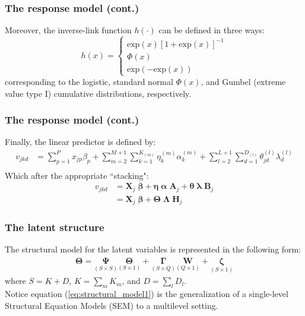 \documentclass[arial,12pt,xcolor=dvipsnames]{beamer}
\begin{document}
%
\begin{frame}
	\frametitle{The response model (cont.)}
	Moreover, the inverse-link function $h(\cdot)$ can be defined in three ways:
	\begin{equation} \label{eq:response_dich1}
		h(x) = 
		\begin{cases}
			\text{exp}(x)[1 + \text{exp}(x)]^{-1} \\
			\Phi(x)  \\
			\text{exp}(-\text{exp}(x))
		\end{cases}
	\end{equation}
	\noindent corresponding to the logistic, standard normal $\Phi(x)$, and Gumbel (extreme value type I) cumulative distributions, respectively.
\end{frame}
%
\begin{frame}
	\frametitle{The response model (cont.)}
	Finally, the linear predictor is defined by:
	\begin{equation} \label{eq:linear_predictor1}
		\begin{split}
			v_{jkd} &= \sum_{p=1}^{P} x_{jp} \beta_{p} + \sum_{m=2}^{M+1} \sum_{k=1}^{K_{(m)}} \eta_{k}^{(m)} \alpha_{k}^{(m)} + \sum_{l=2}^{L+1} \sum_{d=1}^{D_{(l)}} \theta_{jd}^{(l)} \lambda_{d}^{(l)} \\
		\end{split}
	\end{equation}
	Which after the appropriate ``stacking":
	\begin{equation} \label{eq:linear_predictor3}
		\begin{split}
			v_{jkd} &= \mathbf{X}_{j} \; \pmb{\beta} + \pmb{\eta} \; \pmb{\alpha} \; \mathbf{A}_{j} + \pmb{\theta} \; \pmb{\lambda} \; \mathbf{B}_{j} \\
			&= \mathbf{X}_{j} \; \pmb{\beta} + \pmb{\Theta} \; \pmb{\Lambda} \; \mathbf{H}_{j}
		\end{split}
	\end{equation}
\end{frame}
%
\begin{frame}
	\frametitle{The latent structure}
	The structural model for the latent variables is represented in the following form:
	\begin{equation} \label{eq:structural_model1}
		\begin{split}
			\pmb{\Theta} = \underset{(S \times S)}{\pmb{\Psi}} \underset{(S \times 1)}{\pmb{\Theta}} + \underset{(S \times Q)}{\pmb{\Gamma}} \underset{(Q \times 1)}{\mathbf{W}} + \underset{(S \times 1)}{\pmb{\zeta}}
		\end{split}
	\end{equation}
	where $S=K+D$, $K = \sum_{m} K_{m}$, and $D = \sum_{l} D_{l}$. \\
	\vspace{0.3cm} Notice equation (\ref{eq:structural_model1}) is the generalization of a single-level Structural Equation Models (SEM) to a multilevel setting.
\end{frame}
\end{document}
